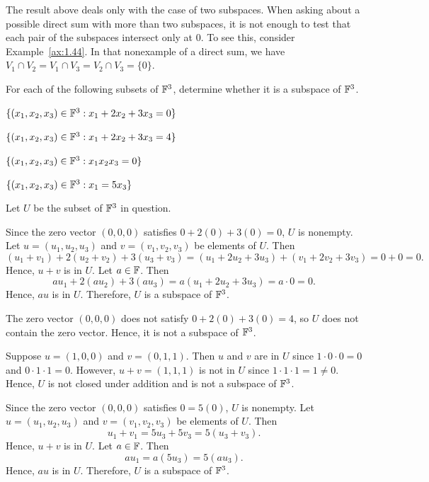 %
The result above deals only with the case of two subspaces. When asking about
a possible direct sum with more than two subspaces, it is not enough to test
that each pair of the subspaces intersect only at $0$. To see this, consider
Example~\ref{ax:1.44}. In that nonexample of a direct sum, we have
$V_1\cap V_2=V_1\cap V_3=V_2\cap V_3=\{0\}$.

\begin{exc}

\begin{exercise}
For each of the following subsets of $\mathbb{F}^3$, determine whether it is a subspace
of $\mathbb{F}^3$.
\begin{parts}
\item $\{(x_1,x_2,x_3)\in\mathbb{F}^3 : x_1+2x_2+3x_3=0\}$
\item $\{(x_1,x_2,x_3)\in\mathbb{F}^3 : x_1+2x_2+3x_3=4\}$
\item $\{(x_1,x_2,x_3)\in\mathbb{F}^3 : x_1x_2x_3=0\}$
\item $\{(x_1,x_2,x_3)\in\mathbb{F}^3 : x_1=5x_3\}$
\end{parts}
\end{exercise}
\begin{solution}
Let $U$ be the subset of $\mathbb{F}^3$ in question.
\begin{parts}
\item Since the zero vector $(0,0,0)$ satisfies $0+2(0)+3(0)=0$, $U$ is
  nonempty. Let $u=(u_1,u_2,u_3)$ and $v=(v_1,v_2,v_3)$ be elements of $U$.
  Then
  \[ (u_1+v_1)+2(u_2+v_2)+3(u_3+v_3)
     = (u_1+2u_2+3u_3)+(v_1+2v_2+3v_3) = 0+0 = 0. \]
  Hence, $u+v$ is in $U$. Let $a\in\mathbb{F}$. Then
  \[ au_1+2(au_2)+3(au_3) = a(u_1+2u_2+3u_3) = a\cdot0 = 0. \]
  Hence, $au$ is in $U$. Therefore, $U$ is a subspace of $\mathbb{F}^3$.
\item The zero vector $(0,0,0)$ does not satisfy $0+2(0)+3(0)=4$, so $U$ does
  not contain the zero vector. Hence, it is not a subspace of $\mathbb{F}^3$.
\item Suppose $u=(1,0,0)$ and $v=(0,1,1)$. Then $u$ and $v$ are in $U$ since
  $1\cdot0\cdot0=0$ and $0\cdot1\cdot1=0$. However, $u+v=(1,1,1)$ is not in $U$
  since $1\cdot1\cdot1=1\ne0$. Hence, $U$ is not closed under addition and is
  not a subspace of $\mathbb{F}^3$.
\item Since the zero vector $(0,0,0)$ satisfies $0=5(0)$, $U$ is nonempty. Let
  $u=(u_1,u_2,u_3)$ and $v=(v_1,v_2,v_3)$ be elements of $U$. Then
  \[ u_1+v_1 = 5u_3+5v_3 = 5(u_3+v_3). \]
  Hence, $u+v$ is in $U$. Let $a\in\mathbb{F}$. Then
  \[ au_1 = a(5u_3) = 5(au_3). \]
  Hence, $au$ is in $U$. Therefore, $U$ is a subspace of $\mathbb{F}^3$.
\end{parts}
\end{solution}


\end{exc}
